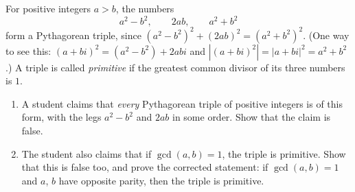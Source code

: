 For positive integers $a>b$, the numbers
\[a^2-b^2,\qquad2ab,\qquad a^2+b^2\]
form a Pythagorean triple, since $\left(a^2-b^2\right)^2+(2ab)^2=\left(a^2+b^2\right)^2$. (One way to see this: $(a+bi)^2=\left(a^2-b^2\right)+2abi$ and $\left|(a+bi)^2\right|=|a+bi|^2=a^2+b^2$.) A triple is called \emph{primitive} if the greatest common divisor of its three numbers is $1$.
\begin{enumerate}
\item[(a)] A student claims that \emph{every} Pythagorean triple of positive integers is of this form, with the legs $a^2-b^2$ and $2ab$ in some order. Show that the claim is false.
\item[(b)] The student also claims that if $\gcd(a,b)=1$, the triple is primitive. Show that this is false too, and prove the corrected statement: if $\gcd(a,b)=1$ and $a$, $b$ have opposite parity, then the triple is primitive.
\end{enumerate}
